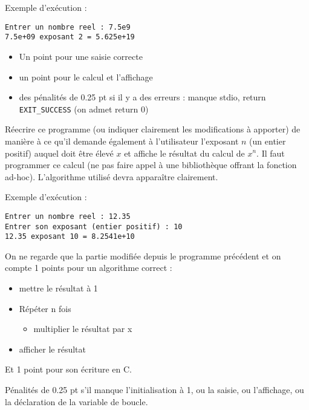 Exemple d'exécution :
\begin{verbatim}
Entrer un nombre reel : 7.5e9 
7.5e+09 exposant 2 = 5.625e+19
\end{verbatim}

\begin{correction}
\end{correction}
\begin{baremeenv}
    \begin{itemize}
  \item Un point pour une saisie correcte
\item un point pour le calcul et l'affichage
\item des pénalités de 0.25 pt si il y a des erreurs : manque stdio, return \verb+EXIT_SUCCESS+ (on admet return 0)
  \end{itemize}
\end{baremeenv}

\question
Réecrire ce programme (ou indiquer clairement les modifications à apporter) de manière à ce qu'il demande également à l'utilisateur l'exposant $n$ (un entier positif) auquel doit être élevé $x$ et affiche le résultat du calcul de $x^n$. Il faut programmer ce calcul (ne pas faire appel à une bibliothèque offrant la fonction ad-hoc). L'algorithme utilisé devra apparaître clairement. 

Exemple d'exécution :
\begin{verbatim}
Entrer un nombre reel : 12.35
Entrer son exposant (entier positif) : 10
12.35 exposant 10 = 8.2541e+10
\end{verbatim}

\begin{correction}
\end{correction}
\begin{baremeenv}
  On ne regarde que la partie modifiée depuis le programme précédent et on compte 1 points pour un algorithme correct :
\begin{itemize}
\item mettre le résultat à 1 
\item Répéter n fois
  \begin{itemize}
  \item multiplier le résultat par x
  \end{itemize}
\item afficher le résultat
\end{itemize}

Et 1 point pour son écriture en C.

Pénalités de 0.25 pt s'il manque l'initialisation à 1, ou la saisie, ou l'affichage, ou la déclaration de la variable de boucle.
\end{baremeenv}

